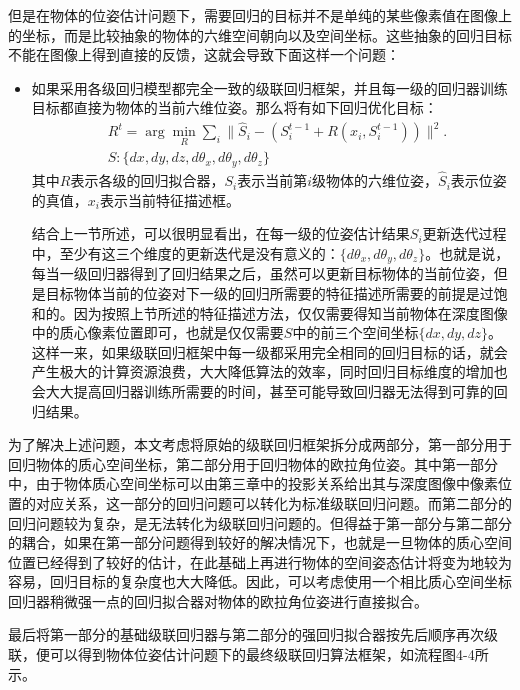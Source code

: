 但是在物体的位姿估计问题下，需要回归的目标并不是单纯的某些像素值在图像上的坐标，而是比较抽象的物体的六维空间朝向以及空间坐标。这些抽象的回归目标不能在图像上得到直接的反馈，这就会导致下面这样一个问题：
\begin{itemize}
\item 如果采用各级回归模型都完全一致的级联回归框架，并且每一级的回归器训练目标都直接为物体的当前六维位姿。那么将有如下回归优化目标：
\begin{equation}
\begin{aligned}
	& R^t=\arg \min_R \sum_i \|\hat{S}_i-(S_i^{t-1}+R(x_i,S_i^{t-1}))\|^2. \\
	& S:\{dx,dy,dz,d\theta_x,d\theta_y,d\theta_z\}
\end{aligned}
\end{equation}
其中$R$表示各级的回归拟合器，$S_i$表示当前第$i$级物体的六维位姿，$\hat{S}_i$表示位姿的真值，$x_i$表示当前特征描述框。

结合上一节所述，可以很明显看出，在每一级的位姿估计结果$S_i$更新迭代过程中，至少有这三个维度的更新迭代是没有意义的：$\{d\theta_x,d\theta_y,d\theta_z\}$。也就是说，每当一级回归器得到了回归结果之后，虽然可以更新目标物体的当前位姿，但是目标物体当前的位姿对下一级的回归所需要的特征描述所需要的前提是过饱和的。因为按照上节所述的特征描述方法，仅仅需要得知当前物体在深度图像中的质心像素位置即可，也就是仅仅需要$S$中的前三个空间坐标$\{dx,dy,dz\}$。这样一来，如果级联回归框架中每一级都采用完全相同的回归目标的话，就会产生极大的计算资源浪费，大大降低算法的效率，同时回归目标维度的增加也会大大提高回归器训练所需要的时间，甚至可能导致回归器无法得到可靠的回归结果。
\end{itemize}

为了解决上述问题，本文考虑将原始的级联回归框架拆分成两部分，第一部分用于回归物体的质心空间坐标，第二部分用于回归物体的欧拉角位姿。其中第一部分中，由于物体质心空间坐标可以由第三章中的投影关系给出其与深度图像中像素位置的对应关系，这一部分的回归问题可以转化为标准级联回归问题。而第二部分的回归问题较为复杂，是无法转化为级联回归问题的。但得益于第一部分与第二部分的耦合，如果在第一部分问题得到较好的解决情况下，也就是一旦物体的质心空间位置已经得到了较好的估计，在此基础上再进行物体的空间姿态估计将变为地较为容易，回归目标的复杂度也大大降低。因此，可以考虑使用一个相比质心空间坐标回归器稍微强一点的回归拟合器对物体的欧拉角位姿进行直接拟合。

最后将第一部分的基础级联回归器与第二部分的强回归拟合器按先后顺序再次级联，便可以得到物体位姿估计问题下的最终级联回归算法框架，如流程图4-4所示。

